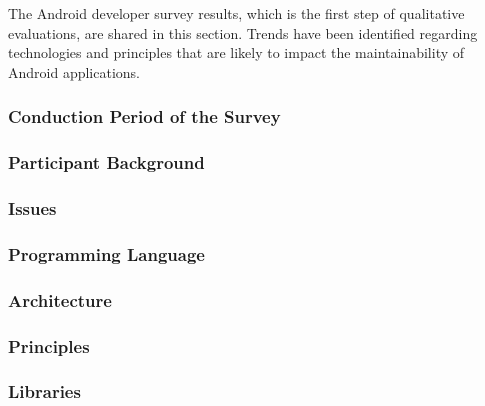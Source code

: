 The Android developer survey results, which is the first step of qualitative evaluations, are shared in this section. Trends have been identified regarding technologies and principles that are likely to impact the maintainability of Android applications.

\subsubsection{Conduction Period of the Survey}


\subsubsection{Participant Background}


\subsubsection{Issues}


\subsubsection{Programming Language}


\subsubsection{Architecture}


\subsubsection{Principles}


\subsubsection{Libraries}
